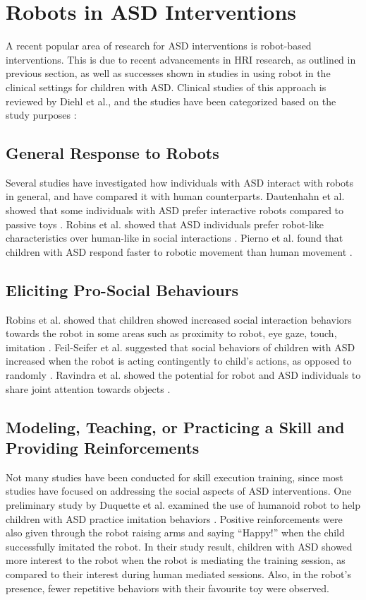 \section{Robots in ASD Interventions}


A recent popular area of research for ASD interventions is robot-based interventions.  This is due to recent advancements in HRI research, as outlined in previous section, as well as successes shown in studies in using robot in the clinical settings for children with ASD.  Clinical studies of this approach is reviewed by Diehl et al., and the studies have been categorized based on the study purposes \cite{diehl2012clinical}:


\subsection{General Response to Robots}
Several studies have investigated how individuals with ASD interact with robots in general, and have compared it with human counterparts.  Dautenhahn et al. showed that some individuals with ASD prefer interactive robots compared to passive toys \cite{dautenhahn2004towards}.  Robins et al. showed that ASD individuals prefer robot-like characteristics over human-like in social interactions \cite{robins2006does}.  Pierno et al. found that children with ASD respond faster to robotic movement than human movement \cite{pierno2008robotic}.


\subsection{Eliciting Pro-Social Behaviours}
Robins et al. showed that children showed increased social interaction behaviors towards the robot in some areas such as proximity to robot, eye gaze, touch, imitation \cite{robins2005robotic}.  Feil-Seifer et al. suggested that social behaviors of children with ASD increased when the robot is acting contingently to child's actions, as opposed to randomly \cite{feil2009toward}.  Ravindra et al. showed the potential for robot and ASD individuals to share joint attention towards objects \cite{ravindra2009therapeutic}.


\subsection{Modeling, Teaching, or Practicing a Skill and Providing Reinforcements}
Not many studies have been conducted for skill execution training, since most studies have focused on addressing the social aspects of ASD interventions.  One preliminary study by Duquette et al. examined the use of humanoid robot to help children with ASD practice imitation behaviors \cite{duquette2008exploring}.  Positive reinforcements were also given through the robot raising arms and saying ``Happy!'' when the child successfully imitated the robot.  In their study result, children with ASD showed more interest to the robot when the robot is mediating the training session, as compared to their interest during human mediated sessions.  Also, in the robot's presence, fewer repetitive behaviors with their favourite toy were observed.


